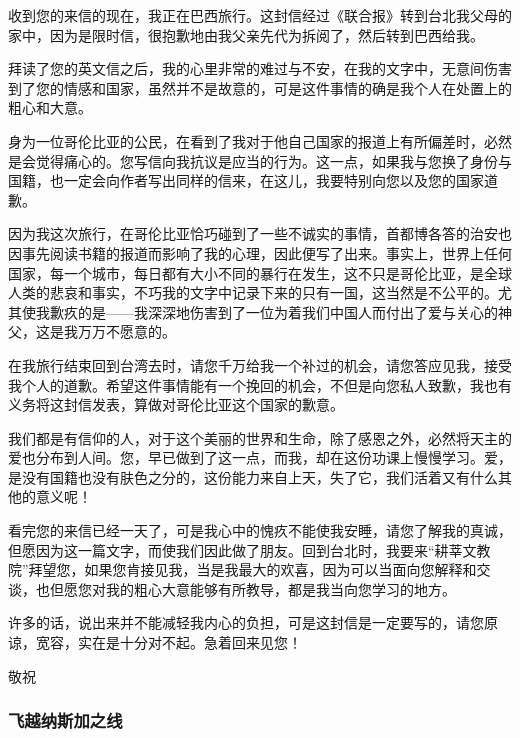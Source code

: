 \par {}
\par 收到您的来信的现在，我正在巴西旅行。这封信经过《联合报》转到台北我父母的家中，因为是限时信，很抱歉地由我父亲先代为拆阅了，然后转到巴西给我。
\par 拜读了您的英文信之后，我的心里非常的难过与不安，在我的文字中，无意间伤害到了您的情感和国家，虽然并不是故意的，可是这件事情的确是我个人在处置上的粗心和大意。
\par 身为一位哥伦比亚的公民，在看到了我对于他自己国家的报道上有所偏差时，必然是会觉得痛心的。您写信向我抗议是应当的行为。这一点，如果我与您换了身份与国籍，也一定会向作者写出同样的信来，在这儿，我要特别向您以及您的国家道歉。
\par 因为我这次旅行，在哥伦比亚恰巧碰到了一些不诚实的事情，首都博各答的治安也因事先阅读书籍的报道而影响了我的心理，因此便写了出来。事实上，世界上任何国家，每一个城市，每日都有大小不同的暴行在发生，这不只是哥伦比亚，是全球人类的悲哀和事实，不巧我的文字中记录下来的只有一国，这当然是不公平的。尤其使我歉疚的是——我深深地伤害到了一位为着我们中国人而付出了爱与关心的神父，这是我万万不愿意的。
\par 在我旅行结束回到台湾去时，请您千万给我一个补过的机会，请您答应见我，接受我个人的道歉。希望这件事情能有一个挽回的机会，不但是向您私人致歉，我也有义务将这封信发表，算做对哥伦比亚这个国家的歉意。
\par 我们都是有信仰的人，对于这个美丽的世界和生命，除了感恩之外，必然将天主的爱也分布到人间。您，早已做到了这一点，而我，却在这份功课上慢慢学习。爱，是没有国籍也没有肤色之分的，这份能力来自上天，失了它，我们活着又有什么其他的意义呢！
\par 看完您的来信已经一天了，可是我心中的愧疚不能使我安睡，请您了解我的真诚，但愿因为这一篇文字，而使我们因此做了朋友。回到台北时，我要来“耕莘文教院”拜望您，如果您肯接见我，当是我最大的欢喜，因为可以当面向您解释和交谈，也但愿您对我的粗心大意能够有所教导，都是我当向您学习的地方。
\par 许多的话，说出来并不能减轻我内心的负担，可是这封信是一定要写的，请您原谅，宽容，实在是十分对不起。急着回来见您！
\par 敬祝
\par {}
\par {}
\par {}

\subsubsection{飞越纳斯加之线}

